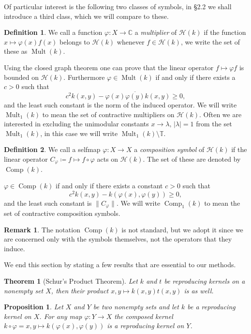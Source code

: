 \documentclass[leqno, final]{article}
\newtheorem{proposition}{Proposition}
\newtheorem*{theorem*}{Theorem} %
\theoremstyle{definition}
\newtheorem{definition}{Definition}
\newtheorem{remark}{Remark}
\newcommand{\plane}{\mathbb{C}}
\newcommand{\torus}{\mathbb{T}}
\newcommand{\Hilbert}{\mathcal{H}}
\renewcommand{\phi}{\varphi}
\DeclareMathOperator{\Mult}{Mult}
\DeclareMathOperator{\Comp}{Comp}
\begin{document}
Of particular interest is the following two classes of symbols, in \S2.2 we shall
introduce a third class, which we will compare to these.
\begin{definition}
We call a function $\phi:X\to\plane$
a \emph{multiplier} of $\Hilbert(k)$ if the function $x\mapsto\phi(x)f(x)$ belongs to
$\Hilbert(k)$ whenever $f\in\Hilbert(k)$, we write the set of these as $\Mult(k)$.
\end{definition}
Using the closed graph theorem one can prove that the linear operator
$f\mapsto \phi f$ is bounded on $\Hilbert(k)$.  Furthermore $\phi\in\Mult(k)$ if and only
if there exists a $c>0$ such that \begin{equation}
	c^2k(x,y) - \phi(x)\overline{\phi(y)}k(x,y) \geq 0,
\end{equation}
and the least such constant is the norm of the induced operator. We will
write $\Mult_1(k)$ to mean the set of contractive multipliers on $\Hilbert(k)$.
Often we are interested in excluding the unimodular constants $x\to\lambda,\,|\lambda|=1$
from the set $\Mult_1(k)$, in this case we will write $\Mult_1(k)\setminus\torus$.

\begin{definition}
We call a selfmap $\phi:X\to X$
a \emph{composition symbol} of $\Hilbert(k)$ if the linear operator $C_\phi\coloneq f\mapsto f\circ\phi$
acts on $\Hilbert(k)$. The set of these are denoted by $\Comp(k)$.
\end{definition}
$\phi\in\Comp(k)$
if and only if there exists a constant $c>0$ such that \begin{equation}
	c^2k(x,y) - k(\phi(x),\phi(y)) \geq 0,
\end{equation}
and the least such constant is $\|C_\phi\|$. We will write $\Comp_1(k)$ to mean the set
of contractive composition symbols.
\begin{remark}
The notation $\Comp(k)$ is not standard, but we adopt it since we are concerned only
with the symbols themselves, not the operators that they induce.
\end{remark}

We end this section by stating a few results that are essential to our methods.
\begin{theorem*}[Schur's Product Theorem]
Let $k$ and $t$ be reproducing kernels on a nonempty set $X$, then their product
$x,y\mapsto k(x,y)t(x,y)$ is as well.
\end{theorem*}

\begin{proposition}
Let $X$ and $Y$ be two nonempty sets and let $k$ be a reproducing kernel on $X$.
For any map $\phi:Y\to X$ the composed kernel $k\circ\phi = x,y\mapsto k(\phi(x),\phi(y))$
is a reproducing kernel on $Y$.
\end{proposition}
\end{document}

